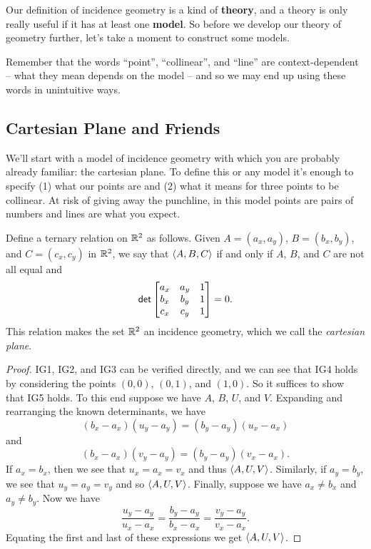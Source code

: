 Our definition of incidence geometry is a kind of \textbf{theory}, and a theory is only really useful if it has at least one \textbf{model}. So before we develop our theory of geometry further, let's take a moment to construct some models.

Remember that the words ``point'', ``collinear'', and ``line'' are context-dependent -- what they mean depends on the model -- and so we may end up using these words in unintuitive ways.



\subsection{Cartesian Plane and Friends}

We'll start with a model of incidence geometry with which you are probably already familiar: the cartesian plane. To define this or any model it's enough to specify (1) what our points are and (2) what it means for three points to be collinear. At risk of giving away the punchline, in this model points are pairs of numbers and lines are what you expect.

\begin{prop} \label{prop:rr2-incidence-geo}
Define a ternary relation on $\mathbb{R}^2$ as follows. Given $A = (a_x, a_y)$, $B = (b_x, b_y)$, and $C = (c_x, c_y)$ in $\mathbb{R}^2$, we say that $\langle A, B, C \rangle$ if and only if $A$, $B$, and $C$ are not all equal and \[ \mathsf{det} \begin{bmatrix} a_x & a_y & 1 \\ b_x & b_y & 1 \\ c_x & c_y & 1 \end{bmatrix} = 0. \] This relation makes the set $\mathbb{R}^2$ an incidence geometry, which we call the \emph{cartesian plane}.
\end{prop}

\begin{proof}
IG1, IG2, and IG3 can be verified directly, and we can see that IG4 holds by considering the points $(0,0)$, $(0,1)$, and $(1,0)$. So it suffices to show that IG5 holds. To this end suppose we have $A$, $B$, $U$, and $V$. Expanding and rearranging the known determinants, we have \[ (b_x - a_x)(u_y - a_y) = (b_y - a_y)(u_x - a_x) \] and \[ (b_x - a_x)(v_y - a_y) = (b_y - a_y)(v_x - a_x). \] If $a_x = b_x$, then we see that $u_x = a_x = v_x$ and thus $\langle A, U, V \rangle$. Similarly, if $a_y = b_y$, we see that $u_y = a_y = v_y$ and so $\langle A, U, V \rangle$. Finally, suppose we have $a_x \neq b_x$ and $a_y \neq b_y$. Now we have \[ \frac{u_y - a_y}{u_x - a_x} = \frac{b_y - a_y}{b_x - a_x} = \frac{v_y - a_y}{v_x - a_x}. \] Equating the first and last of these expressions we get $\langle A, U, V \rangle$.
\end{proof}

